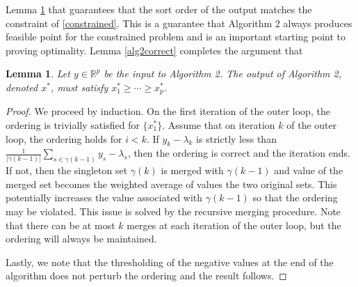 \documentclass{uwstat572}
\newtheorem{lemma}[theorem]{Lemma}
\theoremstyle{remark}
\theoremstyle{definition}
\begin{document}
Lemma \ref{alg2order} that guarantees that the sort order of the output matches the constraint of \eqref{constrained}.  This is a guarantee that Algorithm 2 always produces feasible point for the constrained problem and is an important starting point to proving optimality.  Lemma \ref{alg2correct} completes the argument that 

\begin{lemma}\label{alg2order}
Let $y \in \mathbb{R}^p$ be the input to Algorithm 2. The output of Algorithm 2, denoted $x^*$, must satisfy $x_1^* \geq \cdots \geq x^*_p$. 
\end{lemma}
\begin{proof}
We proceed by induction.  On the first iteration of the outer loop, the ordering is trivially satisfied for $\{x_1^*\}$.  Assume that on iteration $k$ of the outer loop, the ordering holds for $i < k$. If $y_k - \lambda_k$ is strictly less than $\frac{1}{|\gamma(k-1)|} \sum_{s \in \gamma(k-1)} y_s - \lambda_s$, then the ordering is correct and the iteration ends.  If not, then the singleton set $\gamma(k)$ is merged with $\gamma(k-1)$ and value of the merged set becomes the weighted average of values the two original sets. This potentially increases the value associated with $\gamma(k-1)$ so that the ordering may be violated.  This issue is solved by the recursive merging procedure.  Note that there can be at most $k$ merges at each iteration of the outer loop, but the ordering will always be maintained.

Lastly, we note that the thresholding of the negative values at the end of the algorithm does not perturb the ordering and the result follows.
\end{proof}
\end{document}
